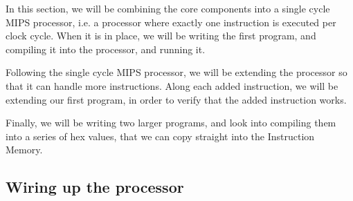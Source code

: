 In this section, we will be combining the core components into a single cycle
MIPS processor, i.e. a processor where exactly one instruction is executed per
clock cycle. When it is in place, we will be writing the first program, and
compiling it into the processor, and running it.

Following the single cycle MIPS processor, we will be extending
the processor so that it can handle more instructions. Along each added
instruction, we will be extending our first program, in order to verify that
the added instruction works.

Finally, we will be writing two larger programs, and look into compiling them
into a series of hex values, that we can copy straight into the Instruction
Memory.

\subsection{Wiring up the processor}
